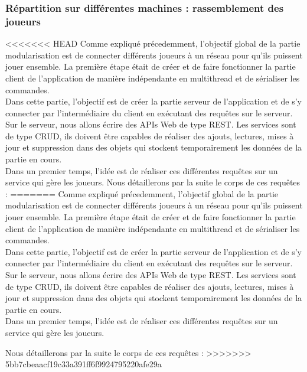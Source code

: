 \documentclass[12pt,a4paper]{article}
\begin{document}
\subsubsection{Répartition sur différentes machines : rassemblement des joueurs}
<<<<<<< HEAD
Comme expliqué précedemment, l'objectif global de la partie modularisation est de connecter différents joueurs à un réseau pour qu'ils puissent jouer ensemble. La première étape était de créer et de faire fonctionner la partie client de l'application de manière indépendante en multithread et de sérialiser les commandes. \\Dans cette partie, l'objectif est de créer la partie serveur de l'application et de s'y connecter par l'intermédiaire du client en exécutant des requêtes sur le serveur. Sur le serveur, nous allons écrire des APIs Web de type REST. Les services sont de type CRUD, ils doivent être capables de réaliser des ajouts, lectures, mises à jour et suppression dans des objets qui stockent temporairement les données de la partie en cours.\\Dans un premier temps, l'idée est de réaliser ces différentes requêtes sur un service qui gère les joueurs. Nous détaillerons par la suite le corps de ces requêtes : 
=======
Comme expliqué précedemment, l'objectif global de la partie modularisation est de connecter différents joueurs à un réseau pour qu'ils puissent jouer ensemble. La première étape était de créer et de faire fonctionner la partie client de l'application de manière indépendante en multithread et de sérialiser les commandes. \\Dans cette partie, l'objectif est de créer la partie serveur de l'application et de s'y connecter par l'intermédiaire du client en exécutant des requêtes sur le serveur. Sur le serveur, nous allons écrire des APIs Web de type REST. Les services sont de type CRUD, ils doivent être capables de réaliser des ajouts, lectures, mises à jour et suppression dans des objets qui stockent temporairement les données de la partie en cours.\\Dans un premier temps, l'idée est de réaliser ces différentes requêtes sur un service qui gère les joueurs. 

Nous détaillerons par la suite le corps de ces requêtes : 
>>>>>>> 5bb7cbeaacf19c33a391ff6f9924795220afe29a
\end{document}
